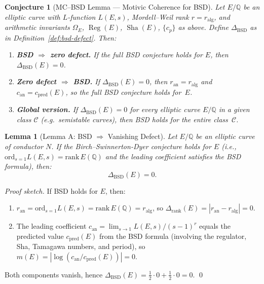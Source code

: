 \documentclass[11pt]{article}
\newtheorem{lemma}[theorem]{Lemma}
\newtheorem{conjecture}[theorem]{Conjecture}
\DeclareMathOperator{\Reg}{Reg}
\DeclareMathOperator{\Sha}{Sha}
\begin{document}
\begin{conjecture}[MC--BSD Lemma --- Motivic Coherence for BSD]
\label{conj:mc-bsd}
Let $E/\mathbb{Q}$ be an elliptic curve with $L$-function $L(E,s)$,
Mordell--Weil rank $r = r_{\mathrm{alg}}$, and arithmetic invariants
$\Omega_E$, $\Reg(E)$, $\Sha(E)$, $\{c_p\}$ as above.  Define
$\Delta_{\mathrm{BSD}}$ as in Definition~\ref{def:bsd-defect}.  Then:
\begin{enumerate}
\item \textbf{BSD $\Rightarrow$ zero defect.}\quad
  If the full BSD conjecture holds for $E$, then $\Delta_{\mathrm{BSD}}(E) = 0$.
\item \textbf{Zero defect $\Rightarrow$ BSD.}\quad
  If $\Delta_{\mathrm{BSD}}(E) = 0$, then $r_{\mathrm{an}} = r_{\mathrm{alg}}$
  and $c_{\mathrm{an}} = c_{\mathrm{pred}}(E)$, so the full BSD conjecture
  holds for~$E$.
\item \textbf{Global version.}\quad
  If $\Delta_{\mathrm{BSD}}(E) = 0$ for every elliptic curve $E/\mathbb{Q}$
  in a given class $\mathcal{C}$ (e.g.\ semistable curves), then BSD holds
  for the entire class~$\mathcal{C}$.
\end{enumerate}
\end{conjecture}

\begin{lemma}[Lemma A: BSD $\Rightarrow$ Vanishing Defect]
\label{lem:bsd-A}
Let $E/\mathbb{Q}$ be an elliptic curve of conductor $N$. If the Birch--Swinnerton-Dyer conjecture holds for $E$ (i.e., $\mathrm{ord}_{s=1} L(E,s) = \mathrm{rank}\, E(\mathbb{Q})$ and the leading coefficient satisfies the BSD formula), then:
\[
  \Delta_{\mathrm{BSD}}(E) = 0.
\]
\end{lemma}

\begin{proof}[Proof sketch]
If BSD holds for $E$, then:
\begin{enumerate}
  \item $r_{\mathrm{an}} = \mathrm{ord}_{s=1} L(E,s) = \mathrm{rank}\, E(\mathbb{Q}) = r_{\mathrm{alg}}$, so $\Delta_{\mathrm{rank}}(E) = |r_{\mathrm{an}} - r_{\mathrm{alg}}| = 0$.
  \item The leading coefficient $c_{\mathrm{an}} = \lim_{s \to 1} L(E,s)/(s-1)^{r}$ equals the predicted value $c_{\mathrm{pred}}(E)$ from the BSD formula (involving the regulator, Sha, Tamagawa numbers, and period), so $m(E) = |\log(c_{\mathrm{an}}/c_{\mathrm{pred}}(E))| = 0$.
\end{enumerate}
Both components vanish, hence $\Delta_{\mathrm{BSD}}(E) = \tfrac{1}{2} \cdot 0 + \tfrac{1}{2} \cdot 0 = 0$. \qed
\end{proof}
\end{document}
